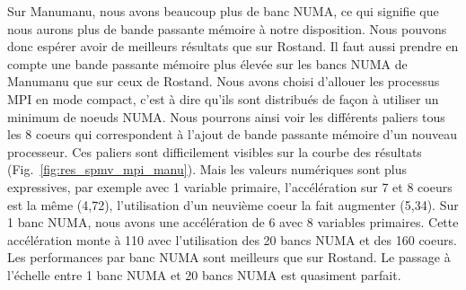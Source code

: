 Sur Manumanu, nous avons beaucoup plus de banc NUMA, ce qui signifie que nous aurons plus de bande passante mémoire à notre disposition.
%
Nous pouvons donc espérer avoir de meilleurs résultats que sur Rostand.
%
Il faut aussi prendre en compte une bande passante mémoire plus élevée sur les bancs NUMA de Manumanu que sur ceux de Rostand.
%
Nous avons choisi d'allouer les processus MPI en mode compact, c'est à dire qu'ils sont distribués de façon à utiliser un minimum de noeuds NUMA.
%
Nous pourrons ainsi voir les différents paliers tous les 8 coeurs qui correspondent à l'ajout de bande passante mémoire d'un nouveau processeur.
%
Ces paliers sont difficilement visibles sur la courbe des résultats (Fig.~\ref{fig:res_spmv_mpi_manu}).
%
Mais les valeurs numériques sont plus expressives, par exemple avec 1 variable primaire, l'accélération sur 7 et 8 coeurs est la même (4,72), l'utilisation d'un neuvième coeur la fait augmenter (5,34).
%
Sur 1 banc NUMA, nous avons une accélération de 6 avec 8 variables primaires.
%
Cette accélération monte à 110 avec l'utilisation des 20 bancs NUMA et des 160 coeurs.
%
Les performances par banc NUMA sont meilleurs que sur Rostand.
%
Le passage à l'échelle entre 1 banc NUMA et 20 bancs NUMA est quasiment parfait.
